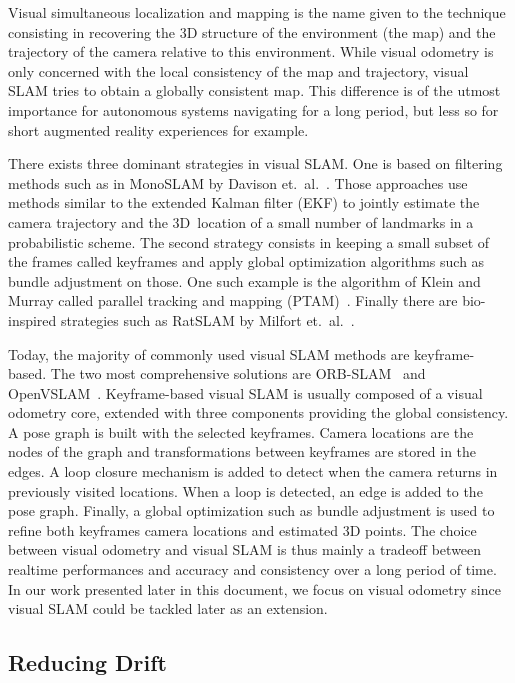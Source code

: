 Visual simultaneous localization and mapping is the name given to the technique
consisting in recovering the 3D structure of the environment (the map)
and the trajectory of the camera relative to this environment.
While visual odometry is only concerned with the local consistency of the
map and trajectory, visual SLAM tries to obtain a globally consistent map.
This difference is of the utmost importance for autonomous systems navigating
for a long period, but less so for short augmented reality experiences for example.

There exists three dominant strategies in visual SLAM.
One is based on filtering methods
such as in MonoSLAM by Davison et.\ al.~\cite{davison2007monoslam}.
Those approaches use methods similar to the extended Kalman filter (EKF)
to jointly estimate the camera trajectory and the 3D location
of a small number of landmarks in a probabilistic scheme.
The second strategy consists in keeping a small subset of the frames
called keyframes and apply global optimization algorithms such as
bundle adjustment on those.
One such example is the algorithm of Klein and Murray called
parallel tracking and mapping (PTAM)~\cite{klein2007parallel}.
Finally there are bio-inspired strategies such as RatSLAM
by Milfort et.\ al.~\cite{milford2004ratslam}.

Today, the majority of commonly used visual SLAM methods are keyframe-based.
The two most comprehensive solutions are ORB-SLAM~\cite{mur2015orb}
and OpenVSLAM~\cite{sumikura2019openvslam}.
Keyframe-based visual SLAM is usually composed of a visual odometry core,
extended with three components providing the global consistency.
A pose graph is built with the selected keyframes.
Camera locations are the nodes of the graph and transformations
between keyframes are stored in the edges.
A loop closure mechanism is added to detect when the camera
returns in previously visited locations.
When a loop is detected, an edge is added to the pose graph.
Finally, a global optimization such as bundle adjustment
is used to refine both keyframes camera locations
and estimated 3D points.
The choice between visual odometry and visual SLAM
is thus mainly a tradeoff between realtime performances
and accuracy and consistency over a long period of time.
In our work presented later in this document, we focus on visual odometry since
visual SLAM could be tackled later as an extension.

\subsection{Reducing Drift}%
\label{sub:reducing-drift}

